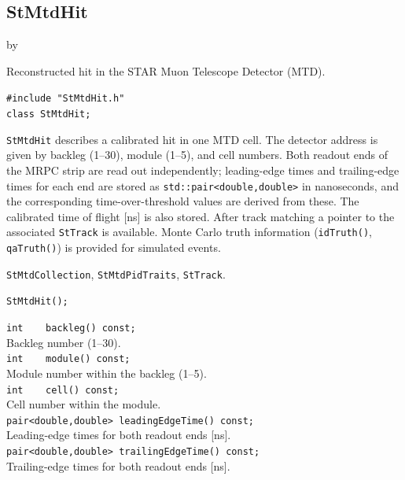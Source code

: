 \documentclass[twoside]{article}
\newcommand{\entrylabel}[1]{\mbox{\textbf{{#1}}}\hfil}%
\newenvironment{entry}
{\begin{list}{}%
    {\renewcommand{\makelabel}{\entrylabel}%
     \setlength{\labelwidth}{90pt}%
     \setlength{\leftmargin}{\labelwidth}
     \advance\leftmargin by \labelsep%
      }%
    }%
  {\end{list}}
\newcommand{\Entrylabel}[1]%
{\raisebox{0pt}[1ex][0pt]{\makebox[\labelwidth][l]%
    {\parbox[t]{\labelwidth}{\hspace{0pt}\textbf{{#1}}}}}}
\newenvironment{Entry}%
{\renewcommand{\entrylabel}{\Entrylabel}\begin{entry}}%
  {\end{entry}}
\begin{document}
\subsection{StMtdHit}
\label{sec:StMtdHit}
\begin{Entry}
\item[Summary] Reconstructed hit in the STAR Muon Telescope Detector (MTD).
\item[Synopsis]
    \verb+#include "StMtdHit.h"+\\
    \verb+class StMtdHit;+\\
\item[Description]
    \texttt{StMtdHit} describes a calibrated hit in one MTD cell.  The
    detector address is given by backleg (1--30), module (1--5), and cell
    numbers.  Both readout ends of the MRPC strip are read out independently;
    leading-edge times and trailing-edge times for each end are stored as
    \verb+std::pair<double,double>+ in nanoseconds, and the corresponding
    time-over-threshold values are derived from these.  The calibrated time
    of flight [ns] is also stored.  After track matching a pointer to the
    associated \texttt{StTrack} is available.  Monte Carlo truth information
    (\verb+idTruth()+, \verb+qaTruth()+) is provided for simulated events.
\item[Related Classes]
    \texttt{StMtdCollection}, \texttt{StMtdPidTraits}, \texttt{StTrack}.
\item[Public\\ Constructors]
    \verb+StMtdHit();+\\
\item[Public Member\\ Functions]
    \verb+int    backleg() const;+\\
    Backleg number (1--30).\\
    \verb+int    module() const;+\\
    Module number within the backleg (1--5).\\
    \verb+int    cell() const;+\\
    Cell number within the module.\\
    \verb+pair<double,double> leadingEdgeTime() const;+\\
    Leading-edge times for both readout ends [ns].\\
    \verb+pair<double,double> trailingEdgeTime() const;+\\
    Trailing-edge times for both readout ends [ns].\\

\end{Entry}
\end{document}

